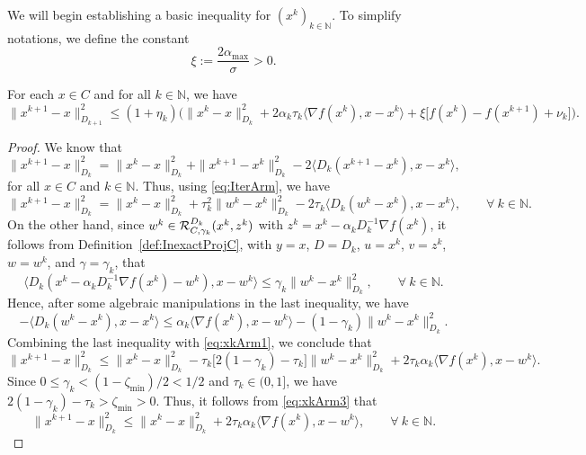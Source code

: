 We will begin establishing  a basic inequality for    $(x^k)_{k\in\mathbb{N}}$.  To simplify  notations, we define the constant
\begin{equation} \label{eq:eta}
	\xi := \dfrac{2 \alpha_{\max}}{\sigma} > 0.
\end{equation}
\begin{lemma}\label{Le:xkArm}
	For each  $x\in C$ and for all $k \in \mathbb{N}$, we have
	\begin{equation}\label{eq:xkArm}
		\|x^{k+1}-x\|_{D_{k+1}}^2 \leq (1+\eta_k)\Big(\|x^k-x\|_{D_k}^2 + 2\alpha_k\tau_k \big\langle \nabla f(x^k), x-x^k\big\rangle + \xi \big[f(x^k) - f(x^{k+1})+ \nu_k \big]\Big).
	\end{equation}
\end{lemma}
\begin{proof}
	We know that $$\|x^{k+1}-x\|_{D_k}^2 = \|x^k-x\|_{D_k}^2 + \|x^{k+1}-x^k\|_{D_k}^2 - 2 \langle {D_k} ( x^{k+1}-x^k), x-x^k \rangle,$$ for all $x \in C$ and $k \in \mathbb{N}$. Thus, using \eqref{eq:IterArm}, we have
	\begin{equation}\label{eq:xkArm1}
		\|x^{k+1}-x\|_{D_k}^2 = \|x^k-x\|_{D_k}^2 + \tau_k^2\|w^k - x^{k}\|_{D_k}^2 - 2 \tau_k \big\langle {D_k}(w^k - x^{k}), x-x^k \big\rangle, \qquad \forall ~k \in \mathbb{N}.
	\end{equation}
	On the other hand, since  $w^k \in{\cal R}_{C,\gamma_k}^{D_k}(x^{k}, z^k)$ with $z^k = x^{k}-\alpha_k D_k^{-1} \nabla f(x^{k})$, it follows from Definition~\ref{def:InexactProjC},  with $y=x$, $D = D_k$, $u = x^k$, $v = z^k$, $w = w^k$,  and $\gamma = \gamma_k$,  that
	$$
		\big\langle D_k(x^k-\alpha_kD_k^{-1}\nabla f(x^k)-w^k), x-w^k\big\rangle \leq \gamma_k \|w^k - x^{k}\|_{D_k}^2, \qquad \forall ~k \in \mathbb{N}.
	$$
	Hence,  after some algebraic manipulations in the last inequality, we have
	$$
		-\big\langle D_k(w^k-x^k), x-x^k\big\rangle \leq \alpha_k \big\langle \nabla f(x^k), x-w^k \big\rangle - (1-\gamma_k) \|w^k-x^k\|_{D_k}^2.
	$$
	Combining the last inequality with \eqref{eq:xkArm1},  we conclude  that
	\begin{equation} \label{eq:xkArm3}
		\|x^{k+1}-x\|_{D_k}^2 \leq \|x^k-x\|_{D_k}^2 - \tau_k \big[2(1-\gamma_k) - \tau_k \big] \|w^k-x^k\|_{D_k}^2 + 2\tau_k\alpha_k \big\langle \nabla f(x^k), x-w^k\big\rangle.
	\end{equation}
	Since $0 \leq \gamma_k <(1-{\zeta_{\min}})/2 < 1/2$ and $\tau_k \in (0, 1]$, we have $2(1-\gamma_k) - \tau_k > {\zeta_{\min}} > 0$. Thus, it follows from \eqref{eq:xkArm3} that
	$$
		\|x^{k+1}-x\|_{D_k}^2 \leq \|x^k-x\|_{D_k}^2 + 2\tau_k\alpha_k \big\langle \nabla f(x^k), x-w^k\big\rangle, \qquad \forall ~k \in \mathbb{N}.
$$
\end{proof}
